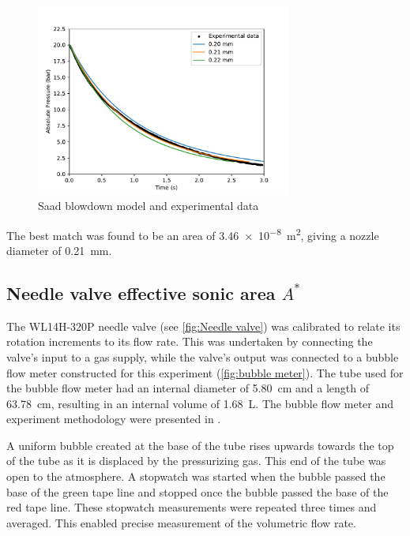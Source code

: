             \begin{figure}[!ht]
                \centering
                \includegraphics[width=0.75\textwidth]{assets/4 experiments/Saad blowdown fit.pdf}
                \caption{Saad blowdown model and experimental data}
                \label{fig:saad blowdown}
            \end{figure}

            The best match was found to be an area of \qty{3.46e-8}{m^2}, giving a nozzle diameter of \qty{0.21}{mm}.

        \subsection{Needle valve effective sonic area $A^*$}

            The WL14H-320P needle valve (see \autoref{fig:Needle valve}) was calibrated to relate its rotation increments to its flow rate. This was undertaken by connecting the valve's input to a gas supply, while the valve's output was connected to a bubble flow meter constructed for this experiment (\autoref{fig:bubble meter}). The tube used for the bubble flow meter had an internal diameter of \qty{5.80}{cm} and a length of \qty{63.78}{cm}, resulting in an internal volume of \qty{1.68}{L}. The bubble flow meter and experiment methodology were presented in \textcite{barigouFluidMechanicsSoap1993}.

            A uniform bubble created at the base of the tube rises upwards towards the top of the tube as it is displaced by the pressurizing gas. This end of the tube was open to the atmosphere. A stopwatch was started when the bubble passed the base of the green tape line and stopped once the bubble passed the base of the red tape line. These stopwatch measurements were repeated three times and averaged. This enabled precise measurement of the volumetric flow rate.

